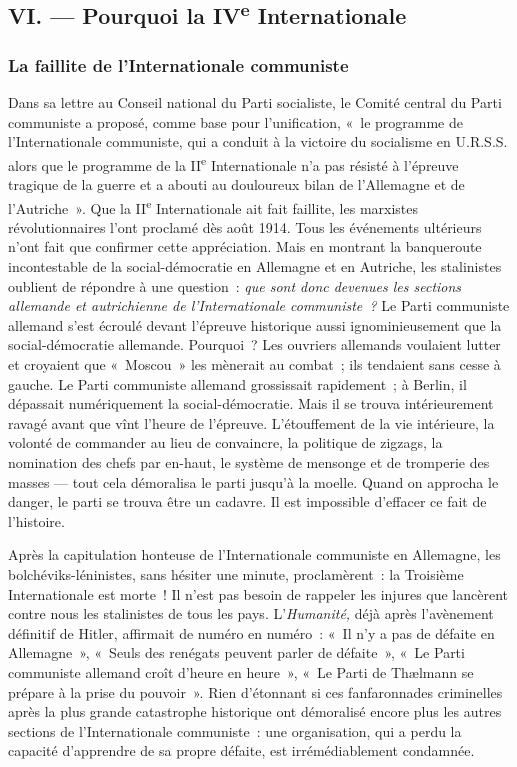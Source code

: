\documentclass[french,twoside]{book} %
\begin{document}
\subsection[{VI. — Pourquoi la IVe Internationale}]{VI. — Pourquoi la IV\textsuperscript{e} Internationale}
\subsubsection[{La faillite de l’Internationale communiste}]{La faillite de l’Internationale communiste}
\noindent Dans sa lettre au Conseil national du Parti socialiste, le Comité central du Parti communiste a proposé, comme base pour l’unification, « le programme de l’Internationale communiste, qui a conduit à la victoire du socialisme en U.R.S.S. alors que le programme de la II\textsuperscript{e} Internationale n’a pas résisté à l’épreuve tragique de la guerre et a abouti au douloureux bilan de l’Allemagne et de l’Autriche ». Que la II\textsuperscript{e} Internationale ait fait faillite, les marxistes révolutionnaires l’ont proclamé dès août 1914. Tous les événements ultérieurs n’ont fait que confirmer cette appréciation. Mais en montrant la banqueroute incontestable de la social-démocratie en Allemagne et en Autriche, les stalinistes oublient de répondre à une question : \emph{que sont donc devenues les sections allemande et autrichienne de l’Internationale communiste ? }Le Parti communiste allemand s’est écroulé devant l’épreuve historique aussi ignominieusement que la social-démocratie allemande. Pourquoi ? Les ouvriers allemands voulaient lutter et croyaient que « Moscou » les mènerait au combat ; ils tendaient sans cesse à gauche. Le Parti  communiste allemand grossissait rapidement ; à Berlin, il dépassait numériquement la social-démocratie. Mais il se trouva intérieurement ravagé avant que vînt l’heure de l’épreuve. L’étouffement de la vie intérieure, la volonté de commander au lieu de convaincre, la politique de zigzags, la nomination des chefs par en-haut, le système de mensonge et de tromperie des masses — tout cela démoralisa le parti jusqu’à la moelle. Quand on approcha le danger, le parti se trouva être un cadavre. Il est impossible d’effacer ce fait de l’histoire.\par
Après la capitulation honteuse de l’Internationale communiste en Allemagne, les bolchéviks-léninistes, sans hésiter une minute, proclamèrent : la Troisième Internationale est morte ! Il n’est pas besoin de rappeler les injures que lancèrent contre nous les stalinistes de tous les pays. L’\emph{Humanité,} déjà après l’avènement définitif de Hitler, affirmait de numéro en numéro : « Il n’y a pas de défaite en Allemagne », « Seuls des renégats peuvent parler de défaite », « Le Parti communiste allemand croît d’heure en heure », « Le Parti de Thælmann se prépare à la prise du pouvoir ». Rien d’étonnant si ces fanfaronnades criminelles après la plus grande catastrophe historique ont démoralisé encore plus les autres sections de l’Internationale communiste : une organisation, qui a perdu la capacité d’apprendre de sa propre défaite, est irrémédiablement condamnée.
\end{document}
